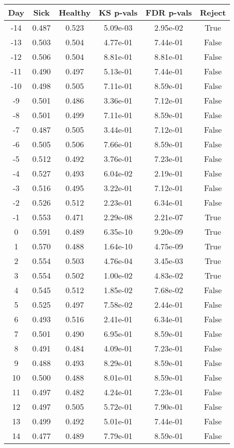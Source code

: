 \begin{tabular}{c|c|c|c|c|c}
Day &  Sick & Healthy &  KS p-vals & FDR p-vals & Reject\\
\hline
-14 & 0.487 &   0.523 &   5.09e-03 &   2.95e-02 &   True\\
-13 & 0.503 &   0.504 &   4.77e-01 &   7.44e-01 &  False\\
-12 & 0.506 &   0.504 &   8.81e-01 &   8.81e-01 &  False\\
-11 & 0.490 &   0.497 &   5.13e-01 &   7.44e-01 &  False\\
-10 & 0.498 &   0.505 &   7.11e-01 &   8.59e-01 &  False\\
 -9 & 0.501 &   0.486 &   3.36e-01 &   7.12e-01 &  False\\
 -8 & 0.501 &   0.499 &   7.11e-01 &   8.59e-01 &  False\\
 -7 & 0.487 &   0.505 &   3.44e-01 &   7.12e-01 &  False\\
 -6 & 0.505 &   0.506 &   7.66e-01 &   8.59e-01 &  False\\
 -5 & 0.512 &   0.492 &   3.76e-01 &   7.23e-01 &  False\\
 -4 & 0.527 &   0.493 &   6.04e-02 &   2.19e-01 &  False\\
 -3 & 0.516 &   0.495 &   3.22e-01 &   7.12e-01 &  False\\
 -2 & 0.526 &   0.512 &   2.23e-01 &   6.34e-01 &  False\\
 -1 & 0.553 &   0.471 &   2.29e-08 &   2.21e-07 &   True\\
  0 & 0.591 &   0.489 &   6.35e-10 &   9.20e-09 &   True\\
  1 & 0.570 &   0.488 &   1.64e-10 &   4.75e-09 &   True\\
  2 & 0.554 &   0.503 &   4.76e-04 &   3.45e-03 &   True\\
  3 & 0.554 &   0.502 &   1.00e-02 &   4.83e-02 &   True\\
  4 & 0.545 &   0.512 &   1.85e-02 &   7.68e-02 &  False\\
  5 & 0.525 &   0.497 &   7.58e-02 &   2.44e-01 &  False\\
  6 & 0.493 &   0.516 &   2.41e-01 &   6.34e-01 &  False\\
  7 & 0.501 &   0.490 &   6.95e-01 &   8.59e-01 &  False\\
  8 & 0.491 &   0.484 &   4.09e-01 &   7.23e-01 &  False\\
  9 & 0.488 &   0.493 &   8.29e-01 &   8.59e-01 &  False\\
 10 & 0.500 &   0.488 &   8.01e-01 &   8.59e-01 &  False\\
 11 & 0.497 &   0.482 &   4.24e-01 &   7.23e-01 &  False\\
 12 & 0.497 &   0.505 &   5.72e-01 &   7.90e-01 &  False\\
 13 & 0.499 &   0.492 &   5.01e-01 &   7.44e-01 &  False\\
 14 & 0.477 &   0.489 &   7.79e-01 &   8.59e-01 &  False\\
\end{tabular}